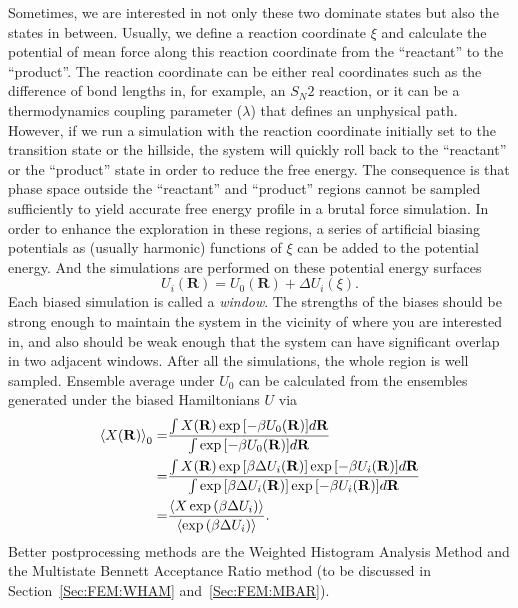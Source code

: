 Sometimes, we are interested in not only these two dominate states but also the states in between. Usually, we define a reaction coordinate $\xi$ and calculate the potential of mean force along this reaction coordinate from the ``reactant'' to the ``product''. The reaction coordinate can be either real coordinates such as the difference of bond lengths in, for example, an $S_N2$ reaction, or it can be a thermodynamics coupling parameter ($\lambda$) that defines an unphysical path. However, if we run a simulation with the reaction coordinate initially set to the transition state or the hillside, the system will quickly roll back to the ``reactant'' or the ``product'' state in order to reduce the free energy. The consequence is that phase space outside the ``reactant'' and ``product'' regions cannot be sampled sufficiently to yield accurate free energy profile in a brutal force simulation. In order to enhance the exploration in these regions, 
a series of artificial biasing potentials as (usually harmonic) functions of $\xi$ can be added to the potential energy. And the simulations are performed on these potential energy surfaces 
\begin{equation}
	U_i(\mathbf{R})=U_0(\mathbf{R})+\Delta U_i(\xi).
\end{equation}
Each biased simulation is called a \textit{window}. The strengths of the biases should be strong enough to maintain the system in the vicinity of where you are interested in, and also should be weak enough that the system can have significant overlap in two adjacent windows. After all the simulations, the whole region is well sampled. Ensemble average under $U_0$ can be calculated from the ensembles generated under the biased Hamiltonians $U$ via
\begin{align}
	\left<X(\mathbf{R})\right>_0=&\frac{\int X(\mathbf{R})\exp{\left[-\beta U_0(\mathbf{R})\right]}d\mathbf{R}}{\int \exp{\left[-\beta U_0(\mathbf{R})\right]}d\mathbf{R}}\notag\\
	                            =&\frac{\int X(\mathbf{R})\exp{\left[\beta \Delta U_i(\mathbf{R})\right]}\exp{\left[-\beta U_i(\mathbf{R})\right]}d\mathbf{R}}{\int \exp{\left[\beta \Delta U_i(\mathbf{R})\right]}\exp{\left[-\beta U_i(\mathbf{R})\right]}d\mathbf{R}}\notag\\
	                =&\frac{\left<X\exp{\left(\beta\Delta U_i\right)}\right>}{\left<\exp{\left(\beta\Delta U_i\right)}\right>}.
\end{align}
Better postprocessing methods are the Weighted Histogram Analysis Method and the Multistate Bennett Acceptance Ratio method (to be discussed in Section~\ref{Sec:FEM:WHAM} and~\ref{Sec:FEM:MBAR}).